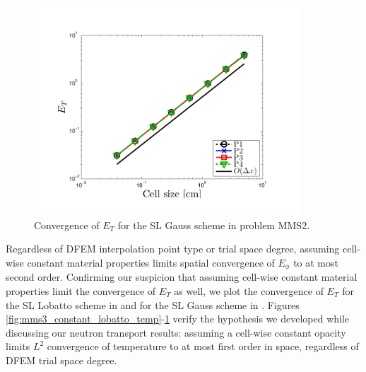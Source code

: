 \begin{figure}[!htp]
\centering
\includegraphics[width=10cm,trim=0.25in  0.2in 0.75in 0.5in,clip=true]{chapter6_grey_radtran/Dissertation_Data/MMS3_Constant_XS_SL_Gauss_temp_L2.pdf}
\caption{Convergence of $E_{T}$ for the SL Gauss scheme in problem MMS2.}
\label{fig:mms3_constant_gauss_temp}
\end{figure}

Regardless of DFEM interpolation point type or trial space degree, assuming cell-wise constant material properties limits spatial convergence of $E_{\phi}$ to at most second order.
Confirming our suspicion that assuming cell-wise constant material properties limit the convergence of $E_T$ as well, we plot the convergence of $E_T$ for the SL Lobatto scheme in  and for the SL Gauss scheme in .
Figures \ref{fig:mms3_constant_lobatto_temp}-\ref{fig:mms3_constant_gauss_temp} verify the hypothesis we developed while discussing our neutron transport results: assuming a cell-wise constant opacity limits $L^2$ convergence of temperature to at most first order in space, regardless of DFEM trial space degree.

